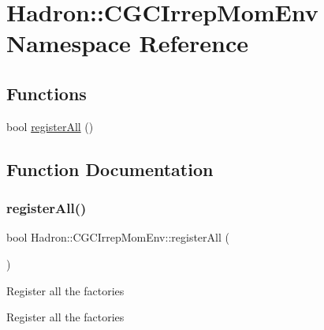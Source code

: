 \hypertarget{namespaceHadron_1_1CGCIrrepMomEnv}{}\section{Hadron\+:\+:C\+G\+C\+Irrep\+Mom\+Env Namespace Reference}
\label{namespaceHadron_1_1CGCIrrepMomEnv}
\subsection*{Functions}
\begin{DoxyCompactItemize}
\item 
bool \mbox{\hyperlink{namespaceHadron_1_1CGCIrrepMomEnv_af8421782c41f7dee9d5b4a17fc748862}{register\+All}} ()
\end{DoxyCompactItemize}


\subsection{Function Documentation}
\mbox{\label{namespaceHadron_1_1CGCIrrepMomEnv_af8421782c41f7dee9d5b4a17fc748862}} 
\subsubsection{\texorpdfstring{registerAll()}{registerAll()}}
{\footnotesize\ttfamily bool Hadron\+::\+C\+G\+C\+Irrep\+Mom\+Env\+::register\+All (\begin{DoxyParamCaption}{ }\end{DoxyParamCaption})}

Register all the factories

Register all the factories

